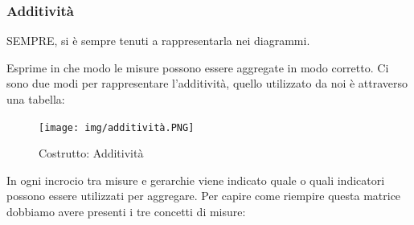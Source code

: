 \subsubsection{Additività}
\begin{info}
	SEMPRE, si è sempre tenuti a rappresentarla nei diagrammi.
\end{info}
Esprime in che modo le misure possono essere aggregate in modo corretto.
Ci sono due modi per rappresentare l'additività, quello utilizzato da noi è attraverso una tabella:
\begin{figure}[H]
	\begin{center}
		\texttt{[image: img/additività.PNG]}
		\caption{Costrutto: Additività}
	\end{center}
\end{figure}
\noindent In ogni incrocio tra misure e gerarchie viene indicato quale o quali indicatori possono essere utilizzati per aggregare.\newline
Per capire come riempire questa matrice dobbiamo avere presenti i tre concetti di misure:
